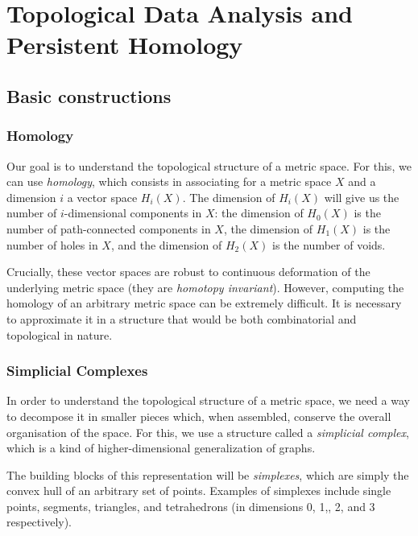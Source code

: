 \documentclass[a4paper,11pt,openany,extrafontsizes]{memoir}
\begin{document}

\chapter{Topological Data Analysis and Persistent Homology}%
\label{cha:tda-ph}

\section{Basic constructions}%
\label{sec:basic-constructions}

\subsection{Homology}%
\label{sec:homology}

Our goal is to understand the topological structure of a metric
space. For this, we can use \emph{homology}, which consists in
associating for a metric space $X$ and a dimension $i$ a vector space
$H_i(X)$. The dimension of $H_i(X)$ will give us the number of
$i$-dimensional components in $X$: the dimension of $H_0(X)$ is the
number of path-connected components in $X$, the dimension of $H_1(X)$
is the number of holes in $X$, and the dimension of $H_2(X)$ is the
number of voids.

Crucially, these vector spaces are robust to continuous deformation of
the underlying metric space (they are \emph{homotopy
  invariant}). However, computing the homology of an arbitrary metric
space can be extremely difficult. It is necessary to approximate it in
a structure that would be both combinatorial and topological in
nature.

\subsection{Simplicial Complexes}%
\label{sec:simplicial-complexes}

In order to understand the topological structure of a metric space, we
need a way to decompose it in smaller pieces which, when assembled,
conserve the overall organisation of the space. For this, we use a
structure called a \emph{simplicial complex}, which is a kind of
higher-dimensional generalization of graphs.

The building blocks of this representation will be \emph{simplexes},
which are simply the convex hull of an arbitrary set of
points. Examples of simplexes include single points, segments,
triangles, and tetrahedrons (in dimensions 0, 1,, 2, and 3
respectively).
\end{document}
